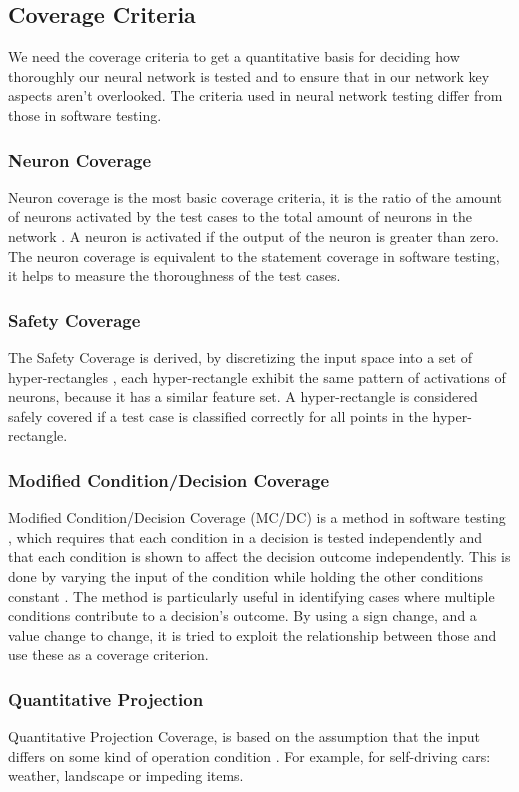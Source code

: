 \subsection*{Coverage Criteria}\label{subsec:coverage-criteria}
We need the coverage criteria to get a quantitative basis for deciding how thoroughly our neural network is tested and to ensure that in our network key aspects aren't overlooked.
The criteria used in neural network testing differ from those in software testing.

\subsubsection{Neuron Coverage}
Neuron coverage is the most basic coverage criteria, it is the ratio of the amount of neurons activated by the test cases to the total amount of neurons in the network \cite{pei_deepxplore_2017}.
A neuron is activated if the output of the neuron is greater than zero.
The neuron coverage is equivalent to the statement coverage in software testing, it helps to measure the thoroughness of the test cases.

\subsubsection{Safety Coverage}
The Safety Coverage is derived, by discretizing the input space into a set of hyper-rectangles \cite{beyer_feature-guided_2018}, each hyper-rectangle exhibit the same pattern of activations of neurons, because it has a similar feature set.
A hyper-rectangle is considered safely covered if a test case is classified correctly for all points in the hyper-rectangle.
\subsubsection{Modified Condition/Decision Coverage}
Modified Condition/Decision Coverage (MC/DC) is a method in software testing \cite{hayhurst_practical_2001}, which requires that each condition in a decision is tested independently and that each condition is shown to affect the decision outcome independently.
This is done by varying the input of the condition while holding the other conditions constant \cite{sun_deepconcolic_2019}.
The method is particularly useful in identifying cases where multiple conditions contribute to a decision's outcome.
By using a sign change, and a value change to change, it is tried to exploit the relationship between those and use these as a coverage criterion.
\subsubsection{Quantitative Projection}
Quantitative Projection Coverage, is based on the assumption that the input differs on some kind of operation condition \cite{cheng_manifesting_2018}.
For example, for self-driving cars: weather, landscape or impeding items.

